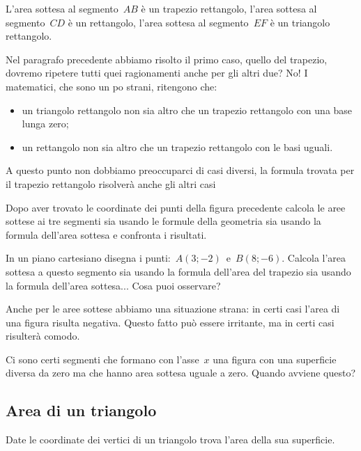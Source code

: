 L'area sottesa al segmento~$AB$ è un trapezio rettangolo, 
l'area sottesa al segmento~$CD$ è un rettangolo, 
l'area sottesa al segmento~$EF$ è un triangolo rettangolo.

Nel paragrafo precedente abbiamo risolto il primo caso, quello del trapezio,
dovremo ripetere tutti quei ragionamenti anche per gli altri due? No! 
I matematici, che sono un po strani, ritengono che:

\begin{itemize} [noitemsep]
 \item 
  un triangolo rettangolo
  non sia altro che un trapezio rettangolo con una base lunga zero;
 \item 
  un rettangolo
  non sia altro che un trapezio rettangolo con le basi uguali.
\end{itemize}

A questo punto non dobbiamo preoccuparci di casi diversi, la formula trovata 
per il trapezio rettangolo risolverà anche gli altri casi

\begin{exrig}
 \begin{esempio}
\label{ex:D.18}
  Dopo aver trovato le coordinate dei punti della figura precedente calcola
  le aree sottese ai tre segmenti sia usando le formule della geometria
  sia usando la formula dell'area sottesa e confronta i risultati.
 \end{esempio}

 \begin{esempio}
  In un piano cartesiano disegna i punti:~$A(3; -2)$~e~$B(8; -6)$. 
  Calcola l'area sottesa a questo segmento sia usando la formula 
  dell'area del trapezio sia usando la formula dell'area sottesa...
  Cosa puoi osservare?
 \end{esempio}
\end{exrig}

Anche per le aree sottese abbiamo una situazione strana: in certi casi 
l'area di una figura risulta negativa. Questo fatto può essere irritante, 
ma in certi casi risulterà comodo.

Ci sono certi segmenti che formano con l'asse~$x$ una figura con una 
superficie diversa da zero ma che hanno area sottesa uguale a zero.
Quando avviene questo?

\subsection{Area di un triangolo}

Date le coordinate dei vertici di un triangolo trova l'area della sua 
superficie.

